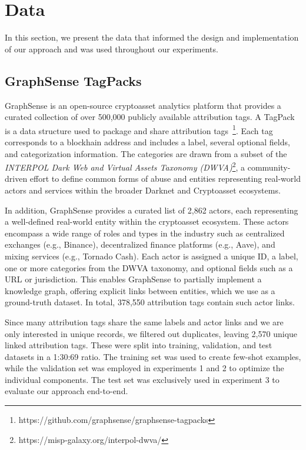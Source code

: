 
\section{Data}
\label{sec:dataset}

In this section, we present the data that informed the design and implementation of our approach and was used throughout our experiments.

\subsection{GraphSense TagPacks}
\label{subsec:data_gs}

GraphSense is an open-source cryptoasset analytics platform that provides a curated collection of over 500,000 publicly available attribution tags. A TagPack is a data structure used to package and share attribution tags~\footnote{https://github.com/graphsense/graphsense-tagpacks}. Each tag corresponds to a blockhain address and includes a label, several optional fields, and categorization information. The categories are drawn from a subset of the \emph{INTERPOL Dark Web and Virtual Assets Taxonomy (DWVA)}\footnote{https://misp-galaxy.org/interpol-dwva/}, a community-driven effort to define common forms of abuse and entities representing real-world actors and services within the broader Darknet and Cryptoasset ecosystems.

In addition, GraphSense provides a curated list of 2,862 actors, each representing a well-defined real-world entity within the cryptoasset ecosystem. These actors encompass a wide range of roles and types in the industry such as centralized exchanges (e.g., Binance), decentralized finance platforms (e.g., Aave), and mixing services (e.g., Tornado Cash). Each actor is assigned a unique ID, a label, one or more categories from the DWVA taxonomy, and optional fields such as a URL or jurisdiction. This enables GraphSense to partially implement a knowledge graph, offering explicit links between entities, which we use as a ground-truth dataset. In total, 378,550 attribution tags contain such actor links.

Since many attribution tags share the same labels and actor links and we are only interested in unique records, we filtered out duplicates, leaving 2,570 unique linked attribution tags. These were split into training, validation, and test datasets in a 1:30:69 ratio. The training set was used to create few-shot examples, while the validation set was employed in experiments 1 and 2 to optimize the individual components. The test set was exclusively used in experiment 3 to evaluate our approach end-to-end.

